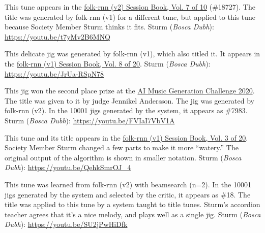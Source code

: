 \documentclass[a4paper,notitlepage,twoside]{book}
\begin{document}
{}
  
\hypertarget{jig:WoldenSailor}{}
This tune appears in the \href{https://highnoongmt.wordpress.com/2018/01/05/volumes-1-20-of-folk-rnn-v1-transcriptions}{folk-rnn (v2) Session Book, Vol. 7 of 10} (\#18727).
The title was generated by folk-rnn (v1) for a different tune, 
but applied to this tune because Society Member Sturm thinks it fits.
Sturm ({\em Bosca Dubh}): \url{https://youtu.be/t7yMv2B6MNQ}
  
{}
  
\hypertarget{jig:RellusTurnpipe}{}
This delicate jig was generated by folk-rnn (v1), which also titled it.
It appears in the \href{https://highnoongmt.wordpress.com/2018/01/05/volumes-1-20-of-folk-rnn-v1-transcriptions}{folk-rnn (v1) Session Book, Vol. 8 of 20}.
Sturm ({\em Bosca Dubh}): \url{https://youtu.be/JrUa-RSpN78}

{}
  
\hypertarget{jig:LonesomeFairy}{}
This jig won the second place prize at the 
\href{https://highnoongmt.wordpress.com/2020/11/20/the-ai-music-generation-challenge-2020-summary-and-results/}{AI Music Generation Challenge 2020}.
The title was given to it by judge Jennikel Andersson.
The jig was generated by folk-rnn (v2).
In the 10001 jigs generated by the system,
it appears as \#7983.
Sturm ({\em Bosca Dubh}): \url{https://youtu.be/FVIaI7VbV1A}

{}  
  
\hypertarget{jig:WatersofHeanny}{}
This tune and its title appears in the \href{https://highnoongmt.wordpress.com/2018/01/05/volumes-1-20-of-folk-rnn-v1-transcriptions}{folk-rnn (v1) Session Book, Vol. 3 of 20}.
Society Member Sturm changed a few parts to make it more ``watery.''
The original output of the algorithm is shown in smaller notation.
Sturm ({\em Bosca Dubh}): \url{https://youtu.be/QehkSmrOJ_4}

{}  
  
\hypertarget{jig:MyOve}{}
This tune was learned from folk-rnn (v2) with beamsearch (n=2).
In the 10001 jigs generated by the system and selected by the critic,
it appears as \#18. 
The title was applied to this tune by a system taught to title tunes.
Sturm's accordion teacher agrees that it's a nice melody,
and plays well as a single jig.
Sturm ({\em Bosca Dubh}): \url{https://youtu.be/SU2jPwHiDfk}
\end{document}
